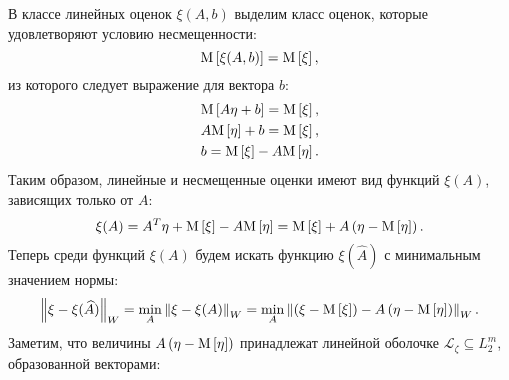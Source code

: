 В классе линейных оценок $\xi(A,b)$ выделим класс оценок, которые удовлетворяют условию несмещенности:
$$
	\mathrm{M} \left [ \xi(A,b) \right ] = \mathrm{M} \left [ \xi \right ] ,
$$
из которого следует выражение для вектора $b$:
\begin{gather*}
	\mathrm{M} \left [ A \eta + b \right ] = \mathrm{M} \left [ \xi \right ] , \\
	A \mathrm{M} \left [ \eta \right ] + b = \mathrm{M} \left [ \xi \right ] , \\
	b = \mathrm{M} \left [ \xi \right ] - A \mathrm{M} \left [ \eta \right ] .
\end{gather*}
Таким образом, линейные и несмещенные оценки имеют вид функций $\xi(A)$, зависящих только от $A$:
\begin{equation} \label{equation:filtering:in_states:variable:unbiased_estimate}
	\xi(A)
		= A^T \eta + \mathrm{M} \left [ \xi \right ] - A \mathrm{M} \left [ \eta \right ]
		= \mathrm{M} \left [ \xi \right ] + A \left ( \eta - \mathrm{M} \left [ \eta \right ] \right ) .
\end{equation}
Теперь среди функций $\xi(A)$ будем искать функцию $\xi(\widehat{A})$ с минимальным значением нормы:
$$
	\left \| \xi - \xi(\widehat{A}) \right \|_{W}
	= \min_{A} \left \| \xi - \xi(A) \right \|_{W}
	= \min_{A} \left \| \left ( \xi - \mathrm{M} \left [ \xi \right ] \right ) - A \left ( \eta - \mathrm{M} \left [ \eta \right ] \right )  \right \|_{W} .
$$
Заметим, что величины $A \left ( \eta - \mathrm{M} \left [ \eta \right ] \right )$ принадлежат линейной оболочке $\mathcal{L}_\zeta \subseteq L_2^m$, образованной векторами:
